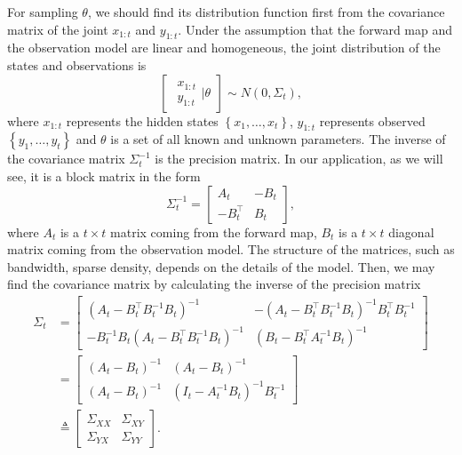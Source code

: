 For sampling $\theta$, we should find its distribution function first from the covariance matrix of the joint $x_{1:t}$ and $y_{1:t}$. Under the assumption that the forward map and the observation model are linear and homogeneous, the joint distribution of the states and observations is  
\begin{equation}\label{generaljointmatrix}
\begin{bmatrix} \begin{matrix} x_{1:t}\\ y_{1:t}  \end{matrix} \biggr\rvert \theta \end{bmatrix}
\sim N\left(0, \Sigma_t \right),
\end{equation}
where $x_{1:t}$ represents the hidden states $\left\lbrace x_1,\dots,x_t\right\rbrace$, $y_{1:t}$ represents observed $\left\lbrace y_1,\dots,y_t\right\rbrace$ and $\theta$ is a set of all known and unknown parameters. The inverse of the covariance matrix $\Sigma_t^{-1}$ is the precision matrix. In our application, as we will see, it is a block matrix in the form  
\begin{equation} \Sigma_t^{-1}=
\begin{bmatrix}
A_t& -B_t \\ -B_t^\top & B_t
\end{bmatrix}, 
\end{equation}
where $A_t$ is a $t \times t$ matrix coming from the forward map, $B_t$ is a $t\times t$ diagonal matrix coming from the observation model. The structure of the matrices, such as bandwidth, sparse density, depends on the details of the model. %
Then, we may find the covariance matrix by calculating the inverse of the precision matrix 
\begin{equation}
\begin{split}
\Sigma_t &= \begin{bmatrix}
\left(A_t-B_t^\top B_t^{-1}B_t\right) ^{-1} & -\left(A_t-B_t^\top B_t^{-1}B_t\right)^{-1}B_t^\top B_t^{-1}\\
- B_t^{-1}B_t\left(A_t-B_t^\top B_t^{-1}B_t\right)^{-1} & \left(B_t-B_t^\top A_t^{-1}B_t\right) ^{-1}
\end{bmatrix} \\
&= \begin{bmatrix}
\left(A_t-B_t\right) ^{-1} & \left(A_t-B_t\right)^{-1}\\
\left(A_t-B_t\right)^{-1} & \left(I_t- A_t^{-1}B_t\right) ^{-1}B_t^{-1}
\end{bmatrix} \\
&\triangleq \begin{bmatrix}
\Sigma_{XX} & \Sigma_{XY} \\
\Sigma_{YX}  &\Sigma_{YY} 
\end{bmatrix}.
\end{split}
\end{equation}
